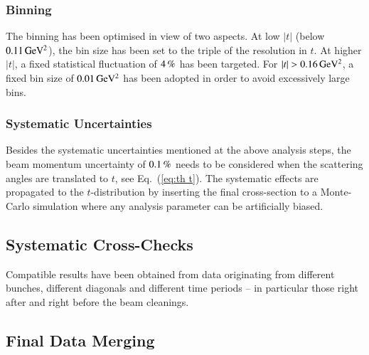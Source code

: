 
\subsubsection{Binning}
\label{sec:binning}

The binning has been optimised in view of two aspects. At low $|t|$ (below $0.11\,{\rm GeV^2}$), the bin size has been set to the triple of the resolution in $t$. At higher $|t|$, a fixed statistical fluctuation of $4\,{\rm \%}$ has been targeted. For $|t| > 0.16\,{\rm GeV^2}$, a fixed bin size of $0.01\,{\rm GeV^2}$ has been adopted in order to avoid excessively large bins.



\subsubsection{Systematic Uncertainties}
\label{sec:systematics}

Besides the systematic uncertainties mentioned at the above analysis steps, the beam momentum uncertainty of $0.1\,{\rm \%}$ needs to be considered when the scattering angles are translated to $t$, see Eq.~(\ref{eq:th t}). The systematic effects are propagated to the $t$-distribution by inserting the final cross-section to a Monte-Carlo simulation where any analysis parameter can be artificially biased. 



\subsection{Systematic Cross-Checks}
\label{sec:cross checks}

Compatible results have been obtained from data originating from different bunches, different diagonals and different time periods -- in particular those right after and right before the beam cleanings.



\subsection{Final Data Merging}
\label{sec:final data merging}

